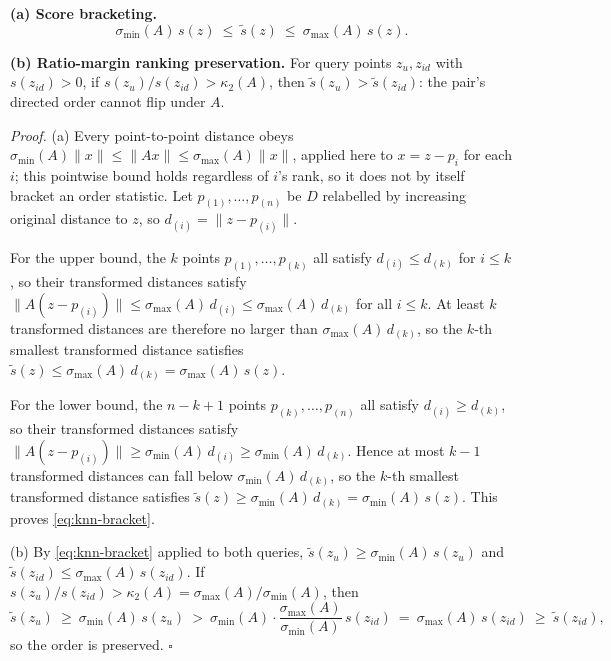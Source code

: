 \documentclass[11pt,a4paper]{article}
\begin{document}
\textbf{(a) Score bracketing.}
\begin{equation}
\sigma_{\min}(A)\,s(z)\ \le\ \widetilde s(z)\ \le\ \sigma_{\max}(A)\,s(z).
\label{eq:knn-bracket}
\end{equation}

\textbf{(b) Ratio-margin ranking preservation.} For query points $z_u,z_{id}$ with $s(z_{id})>0$, if $s(z_u)/s(z_{id})>\kappa_2(A)$, then $\widetilde s(z_u)>\widetilde s(z_{id})$: the pair's directed order cannot flip under $A$.

\emph{Proof.} (a) Every point-to-point distance obeys $\sigma_{\min}(A)\|x\|\le\|Ax\|\le\sigma_{\max}(A)\|x\|$, applied here to $x=z-p_i$ for each $i$; this pointwise bound holds regardless of $i$'s rank, so it does not by itself bracket an order statistic. Let $p_{(1)},\ldots,p_{(n)}$ be $D$ relabelled by increasing original distance to $z$, so $d_{(i)}=\|z-p_{(i)}\|$.

For the upper bound, the $k$ points $p_{(1)},\ldots,p_{(k)}$ all satisfy $d_{(i)}\le d_{(k)}$ for $i\le k$, so their transformed distances satisfy $\|A(z-p_{(i)})\|\le\sigma_{\max}(A)\,d_{(i)}\le\sigma_{\max}(A)\,d_{(k)}$ for all $i\le k$. At least $k$ transformed distances are therefore no larger than $\sigma_{\max}(A)\,d_{(k)}$, so the $k$-th smallest transformed distance satisfies $\widetilde s(z)\le\sigma_{\max}(A)\,d_{(k)}=\sigma_{\max}(A)\,s(z)$.

For the lower bound, the $n-k+1$ points $p_{(k)},\ldots,p_{(n)}$ all satisfy $d_{(i)}\ge d_{(k)}$, so their transformed distances satisfy $\|A(z-p_{(i)})\|\ge\sigma_{\min}(A)\,d_{(i)}\ge\sigma_{\min}(A)\,d_{(k)}$. Hence at most $k-1$ transformed distances can fall below $\sigma_{\min}(A)\,d_{(k)}$, so the $k$-th smallest transformed distance satisfies $\widetilde s(z)\ge\sigma_{\min}(A)\,d_{(k)}=\sigma_{\min}(A)\,s(z)$. This proves \eqref{eq:knn-bracket}.

(b) By \eqref{eq:knn-bracket} applied to both queries, $\widetilde s(z_u)\ge\sigma_{\min}(A)\,s(z_u)$ and $\widetilde s(z_{id})\le\sigma_{\max}(A)\,s(z_{id})$. If $s(z_u)/s(z_{id})>\kappa_2(A)=\sigma_{\max}(A)/\sigma_{\min}(A)$, then
\[
\widetilde s(z_u)\ \ge\ \sigma_{\min}(A)\,s(z_u)\ >\ \sigma_{\min}(A)\cdot\frac{\sigma_{\max}(A)}{\sigma_{\min}(A)}\,s(z_{id})\ =\ \sigma_{\max}(A)\,s(z_{id})\ \ge\ \widetilde s(z_{id}),
\]
so the order is preserved. \hfill$\square$
\end{document}
